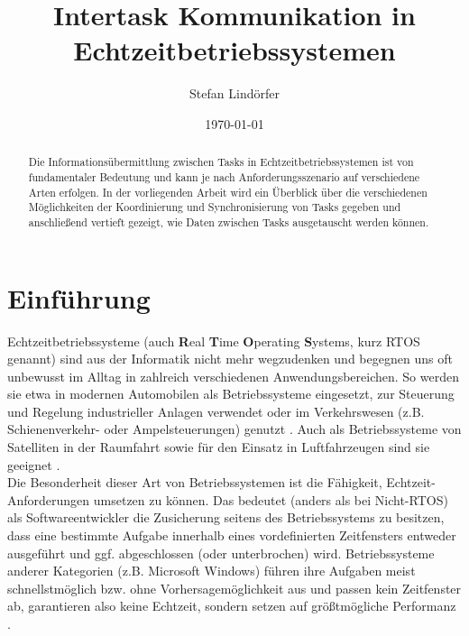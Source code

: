 \documentclass{llncs}
\begin{document}
\title{Intertask Kommunikation in Echtzeitbetriebssystemen}
\author{Stefan Lindörfer\\
}

\date{\today}

\maketitle

\renewcommand{\abstractname}{Abstract}

\begin{abstract}
	Die Informationsübermittlung zwischen Tasks in Echtzeitbetriebssystemen ist von fundamentaler Bedeutung und kann je nach Anforderungsszenario auf verschiedene Arten erfolgen. In der vorliegenden Arbeit wird ein Überblick über die verschiedenen Möglichkeiten der Koordinierung und Synchronisierung von Tasks gegeben und anschließend vertieft gezeigt, wie Daten zwischen Tasks ausgetauscht werden können.
\end{abstract}

\section{Einführung}
\label{subsec:Einführung}
Echtzeitbetriebssysteme (auch \textbf{R}eal \textbf{T}ime \textbf{O}perating \textbf{S}ystems, kurz RTOS genannt) sind aus der Informatik nicht mehr wegzudenken und begegnen uns oft unbewusst im Alltag in zahlreich verschiedenen Anwendungsbereichen. So werden sie etwa in modernen Automobilen als Betriebssysteme eingesetzt, zur Steuerung und Regelung industrieller Anlagen verwendet oder im Verkehrswesen (z.B. Schienenverkehr- oder Ampelsteuerungen) genutzt \autocite[vgl.][157]{Winzker2008}. Auch als Betriebssysteme von Satelliten in der Raumfahrt sowie für den Einsatz in Luftfahrzeugen sind sie geeignet \autocite[vgl.][]{Systems2017} \autocite[vgl.][]{RODOS2017}.\\

Die Besonderheit dieser Art von Betriebssystemen ist die Fähigkeit, Echtzeit-Anforderungen umsetzen zu können. Das bedeutet (anders als bei Nicht-RTOS) als Softwareentwickler die Zusicherung seitens des Betriebssystems zu besitzen, dass eine bestimmte Aufgabe innerhalb eines vordefinierten Zeitfensters entweder ausgeführt und ggf. abgeschlossen (oder unterbrochen) wird. Betriebssysteme anderer Kategorien (z.B. Microsoft Windows) führen ihre Aufgaben meist schnellstmöglich bzw. ohne Vorhersagemöglichkeit aus und passen kein Zeitfenster ab, garantieren also keine Echtzeit, sondern setzen auf größtmögliche Performanz \autocite[vgl.][317]{HeinzWoern2005}.\\
\end{document}
